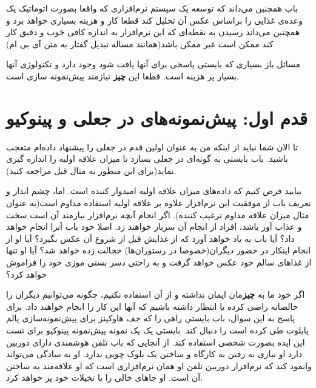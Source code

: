 باب همچنین می‌داند که توسعه یک سیستم نرم‌افزاری که واقعا بصورت اتوماتیک
یک وعده‌ی غذایی را براساس عکس آن تحلیل کند قطعا کار و هزینه بسیاری خواهد
برد و همچنین می‌داند رسیدن به نقطه‌ای که این نرم‌افزار به اندازه کافی
خوب و دقیق کار کند ممکن است غیر ممکن باشد(همانند مساله تبدیل گفتار به
متن آی بی ام)

مسائل باز بسیاری که بایستی پاسخی برای آنها یافت شود وجود دارد و تکنولوژی
آنها بسیار پر هزینه است. قطعا این \textbf{چیز} نیازمند پیش‌نمونه سازی
است.

\section{قدم اول: پیش‌نمونه‌های در جعلی و
پینوکیو}\label{ux642ux62fux645-ux627ux648ux644-ux67eux6ccux634ux646ux645ux648ux646ux647ux647ux627ux6cc-ux62fux631-ux62cux639ux644ux6cc-ux648-ux67eux6ccux646ux648ux6a9ux6ccux648}

تا الان شما نباید از اینکه من به عنوان اولین قدم در جعلی را پیشنهاد
داده‌ام متعجب باشید. باب بایستی به گونه‌ای در جعلی بسازد تا میزان علاقه
اولیه را اندازه گیری نماید(برای این منظور به مثال قبل مراجعه کنید).

بیایید فرض کنیم که داده‌های میزان علاقه اولیه امیدوار کننده است. اما،
چشم انداز و تعریف باب از موفقیت این نرم‌افزار علاوه بر علاقه اولیه
استفاده مداوم است(به عنوان مثال میزان علاقه مداوم ترغیب کننده). اگر
انجام آنچه نرم‌افزار نیازمند آن است سخت و عذاب آور باشد، افراد از انجام
آن سرباز خواهند زد. اصلا خود باب آنرا انجام خواهد داد؟ آیا باب به یاد
خواهد آورد که از غذایش قبل از شروع آن عکس بگیرد؟ آیا او از انجام اینکار
در حضور دیگران(خصوصا در رستوران‌ها) خجالت زده خواهد شد؟ آیا او تنها از
غذاهای سالم خود عکس خواهد گرفت و به راحتی دسر بستی موزی خود را فراموش
خواهد کرد؟

اگر خود ما به \textbf{چیز}مان ایمان نداشته و از آن استفاده نکنیم، چگونه
می‌توانیم دیگران را خالصانه راضی کرده یا انتظار داشته باشیم که آنها این
کار را انجام خواهند داد. برای پاسخ به این سوال، باب بایستی راهی را که جف
هاوکینز برای پیش‌نمونه‌سازی پالم پایلوت طی کرده است را دنبال کند. بایستی
یک یک نمونه پیش‌نمونه پینوکیو برای تست این ایده بصورت شخصی استفاده کند.
از آنجایی که باب تلفن هوشمندی دارای دوربین دارد او نیازی به رفتن به
کارگاه و ساختن یک بلوک چوبی ندارد. او به سادگی می‌تواند وانمود کند که
نرم‌افزار دوربین تلفن او همان نرم‌افزاری است که او علاقه‌مند به ساختن آن
است. او جاهای خالی را با تخیلات خود پر خواهد کرد.
